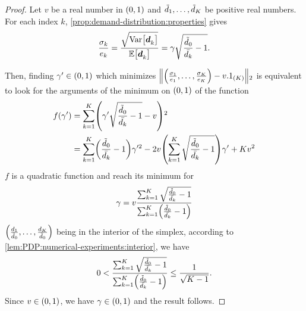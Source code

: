 \begin{proof}
Let $v$ be a real number in $\bracket{0,1}$ and $\tilde{d}_1,\ldots,\tilde{d}_K$ be positive real numbers.
For each index $k$, \cref{prop:demand-distribution:properties} gives
\begin{equation}
  \frac{\sigma_k}{e_k}
  = \frac{\sqrt{\vari\sqbracket{\va\demand_k}}}{\espe\sqbracket{\va\demand_k}}
  = \gamma\sqrt{\frac{\tilde{\demand}_0}{\bar{\demand_k}}-1}.
\end{equation}

Then, finding $\gamma'\in\bracket{0,1}$ which minimizes $\norm{\bracket{\frac{\sigma_1}{e_1},\ldots,\frac{\sigma_K}{e_K}}-v.1_{(K)}}_2$ is equivalent to look for the arguments of the minimum on $\bracket{0,1}$ of the function
\begin{subequations}
\begin{align}
  f\bracket{\gamma'}
  &= \sum_{k=1}^K \bracket{\gamma'\sqrt{\frac{\tilde{\demand}_0}{\bar{\demand_k}}-1}-v}^2
  \\
  &= \sum_{k=1}^K\bracket{\frac{\tilde{\demand}_0}{\bar{\demand_k}}-1}\gamma'^2
  - 2v\bracket{\sum_{k=1}^K\sqrt{\frac{\tilde{\demand}_0}{\bar{\demand_k}}-1}}\gamma'
  + K v^2
\end{align}
\end{subequations}
$f$ is a quadratic function and reach its minimum for
\begin{equation}
  \gamma
  =
  v\frac
  {\sum_{k=1}^K\sqrt{\frac{\tilde{\demand}_0}{\bar{\demand_k}}-1}}
  {\sum_{k=1}^K\bracket{\frac{\tilde{\demand}_0}{\bar{\demand_k}}-1}}
\end{equation}
$\bracket{\frac{\demand_1}{\tilde{\demand}_0},\ldots,\frac{\demand_K}{\tilde{\demand}_0}}$ being in the interior of the simplex, according to \cref{lem:PDP:numerical-experiments:interior}, we have
\begin{equation}
  0 <
  \frac
  {\sum_{k=1}^K\sqrt{\frac{\tilde{\demand}_0}{\bar{\demand_k}}-1}}
  {\sum_{k=1}^K\bracket{\frac{\tilde{\demand}_0}{\bar{\demand_k}}-1}}
  \le
  \frac{1}{\sqrt{K-1}}.
\end{equation}
Since $v\in\bracket{0,1}$, we have $\gamma\in\bracket{0,1}$ and the result follows.
\end{proof}



